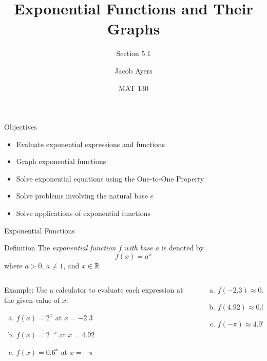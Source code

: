 \documentclass[t, aspectratio=169]{beamer}
\title[5.1]{Exponential Functions and Their Graphs}
\subtitle{Section 5.1}
\author{Jacob Ayers}
\institute{Lesson \#17}
\date{MAT 130}
\def\R{\mathbb{R}} %
\begin{document}
	
	\begin{frame}
		\titlepage
	\end{frame}
	
	\begin{frame}{Objectives}
		\begin{itemize}
			\item Evaluate exponential expressions and functions
			\item Graph exponential functions
			\item Solve exponential equations using the One-to-One Property
			\item Solve problems involving the natural base $e$
			\item Solve applications of exponential functions
		\end{itemize}
	\end{frame}

	\begin{frame}{Exponential Functions}
		\begin{block}{Definition}
			The \textit{exponential function $f$ with base $a$} is denoted by $$f(x) = a^x$$ where $a > 0$, $a \neq 1$, and $x \in \R$
		\end{block} \pause
	
		\begin{columns}
			\begin{column}{0.5\textwidth}
				Example: Use a calculator to evaluate each expression at the given value of $x$: \begin{enumerate}[a)]
					\item $f(x)=2^x$ at $x = -2.3$
					\item $f(x)=2^{-x}$ at $x = 4.92$
					\item $f(x)=0.6^x$ at $x = -\pi$
				\end{enumerate} 
			\end{column} \pause
			\begin{column}{0.5\textwidth}
				\begin{enumerate}[a)]
					\item $f(-2.3) \approx 0.2031$
					\item $f(4.92) \approx 0.03303$
					\item $f(-\pi) \approx 4.9769$
				\end{enumerate}
			\end{column}
		\end{columns}
	\end{frame}
\end{document}

